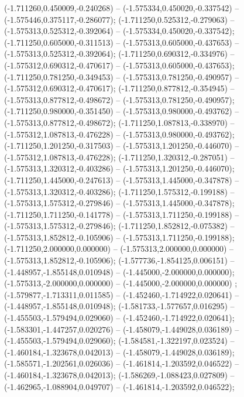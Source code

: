  (-1.711260,0.450009,-0.240268) -- (-1.575334,0.450020,-0.337542) -- (-1.575446,0.375117,-0.286077);
 (-1.711250,0.525312,-0.279063) -- (-1.575313,0.525312,-0.392064) -- (-1.575334,0.450020,-0.337542);
 (-1.711250,0.605000,-0.311513) -- (-1.575313,0.605000,-0.437653) -- (-1.575313,0.525312,-0.392064);
 (-1.711250,0.690312,-0.334976) -- (-1.575312,0.690312,-0.470617) -- (-1.575313,0.605000,-0.437653);
 (-1.711250,0.781250,-0.349453) -- (-1.575313,0.781250,-0.490957) -- (-1.575312,0.690312,-0.470617);
 (-1.711250,0.877812,-0.354945) -- (-1.575313,0.877812,-0.498672) -- (-1.575313,0.781250,-0.490957);
 (-1.711250,0.980000,-0.351450) -- (-1.575313,0.980000,-0.493762) -- (-1.575313,0.877812,-0.498672);
 (-1.711250,1.087813,-0.338970) -- (-1.575312,1.087813,-0.476228) -- (-1.575313,0.980000,-0.493762);
 (-1.711250,1.201250,-0.317503) -- (-1.575313,1.201250,-0.446070) -- (-1.575312,1.087813,-0.476228);
 (-1.711250,1.320312,-0.287051) -- (-1.575313,1.320312,-0.403286) -- (-1.575313,1.201250,-0.446070);
 (-1.711250,1.445000,-0.247613) -- (-1.575313,1.445000,-0.347878) -- (-1.575313,1.320312,-0.403286);
 (-1.711250,1.575312,-0.199188) -- (-1.575313,1.575312,-0.279846) -- (-1.575313,1.445000,-0.347878);
 (-1.711250,1.711250,-0.141778) -- (-1.575313,1.711250,-0.199188) -- (-1.575313,1.575312,-0.279846);
 (-1.711250,1.852812,-0.075382) -- (-1.575313,1.852812,-0.105906) -- (-1.575313,1.711250,-0.199188);
 (-1.711250,2.000000,0.000000) -- (-1.575313,2.000000,0.000000) -- (-1.575313,1.852812,-0.105906);
 (-1.577736,-1.854125,0.006151) -- (-1.448957,-1.855148,0.010948) -- (-1.445000,-2.000000,0.000000);
 (-1.575313,-2.000000,0.000000) -- (-1.445000,-2.000000,0.000000) ;
 (-1.579877,-1.713311,0.011585) -- (-1.452460,-1.714922,0.020641) -- (-1.448957,-1.855148,0.010948);
 (-1.581733,-1.577657,0.016295) -- (-1.455503,-1.579494,0.029060) -- (-1.452460,-1.714922,0.020641);
 (-1.583301,-1.447257,0.020276) -- (-1.458079,-1.449028,0.036189) -- (-1.455503,-1.579494,0.029060);
 (-1.584581,-1.322197,0.023524) -- (-1.460184,-1.323678,0.042013) -- (-1.458079,-1.449028,0.036189);
 (-1.585571,-1.202561,0.026036) -- (-1.461814,-1.203592,0.046522) -- (-1.460184,-1.323678,0.042013);
 (-1.586269,-1.088423,0.027809) -- (-1.462965,-1.088904,0.049707) -- (-1.461814,-1.203592,0.046522);
